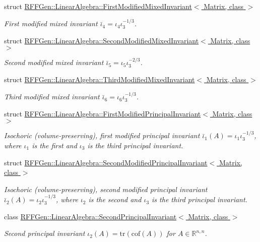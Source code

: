 \begin{DoxyCompactItemize}
struct \hyperlink{structRFFGen_1_1LinearAlgebra_1_1FirstModifiedMixedInvariant}{R\-F\-F\-Gen\-::\-Linear\-Algebra\-::\-First\-Modified\-Mixed\-Invariant$<$ Matrix, class $>$}
\begin{DoxyCompactList}\small\item\em First modified mixed invariant $\bar\iota_4=\iota_4\iota_3^{-1/3}$. \end{DoxyCompactList}\item 
struct \hyperlink{structRFFGen_1_1LinearAlgebra_1_1SecondModifiedMixedInvariant}{R\-F\-F\-Gen\-::\-Linear\-Algebra\-::\-Second\-Modified\-Mixed\-Invariant$<$ Matrix, class $>$}
\begin{DoxyCompactList}\small\item\em Second modified mixed invariant $\bar\iota_5=\iota_5\iota_3^{-2/3}$. \end{DoxyCompactList}\item 
struct \hyperlink{structRFFGen_1_1LinearAlgebra_1_1ThirdModifiedMixedInvariant}{R\-F\-F\-Gen\-::\-Linear\-Algebra\-::\-Third\-Modified\-Mixed\-Invariant$<$ Matrix, class $>$}
\begin{DoxyCompactList}\small\item\em Third modified mixed invariant $\bar\iota_6=\iota_6\iota_3^{-1/3}$. \end{DoxyCompactList}\item 
struct \hyperlink{structRFFGen_1_1LinearAlgebra_1_1FirstModifiedPrincipalInvariant}{R\-F\-F\-Gen\-::\-Linear\-Algebra\-::\-First\-Modified\-Principal\-Invariant$<$ Matrix, class $>$}
\begin{DoxyCompactList}\small\item\em Isochoric (volume-\/preserving), first modified principal invariant $ \bar\iota_1(A)=\iota_1\iota_3^{-1/3} $, where $\iota_1$ is the first and $\iota_3$ is the third principal invariant. \end{DoxyCompactList}\item 
struct \hyperlink{structRFFGen_1_1LinearAlgebra_1_1SecondModifiedPrincipalInvariant}{R\-F\-F\-Gen\-::\-Linear\-Algebra\-::\-Second\-Modified\-Principal\-Invariant$<$ Matrix, class $>$}
\begin{DoxyCompactList}\small\item\em Isochoric (volume-\/preserving), second modified principal invariant $ \bar\iota_2(A)=\iota_2\iota_3^{-1/3} $, where $\iota_2$ is the second and $\iota_3$ is the third principal invariant. \end{DoxyCompactList}\item 
class \hyperlink{classRFFGen_1_1LinearAlgebra_1_1SecondPrincipalInvariant}{R\-F\-F\-Gen\-::\-Linear\-Algebra\-::\-Second\-Principal\-Invariant$<$ Matrix, class $>$}
\begin{DoxyCompactList}\small\item\em Second principal invariant $ \iota_2(A)=\mathrm{tr}(\mathrm{cof}(A)) $ for $A\in\mathbb{R}^{n,n}$. \end{DoxyCompactList}\end{DoxyCompactItemize}
